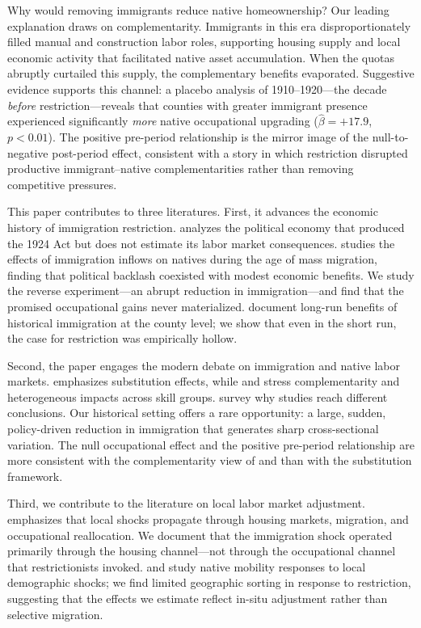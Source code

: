 \documentclass[12pt]{article}
\begin{document}
Why would removing immigrants reduce native homeownership? Our leading explanation draws on complementarity. Immigrants in this era disproportionately filled manual and construction labor roles, supporting housing supply and local economic activity that facilitated native asset accumulation. When the quotas abruptly curtailed this supply, the complementary benefits evaporated. Suggestive evidence supports this channel: a placebo analysis of 1910--1920---the decade \textit{before} restriction---reveals that counties with greater immigrant presence experienced significantly \textit{more} native occupational upgrading ($\hat{\beta} = +17.9$, $p < 0.01$). The positive pre-period relationship is the mirror image of the null-to-negative post-period effect, consistent with a story in which restriction disrupted productive immigrant--native complementarities rather than removing competitive pressures.

This paper contributes to three literatures. First, it advances the economic history of immigration restriction. \citet{goldin1994} analyzes the political economy that produced the 1924 Act but does not estimate its labor market consequences. \citet{tabellini2020} studies the effects of immigration inflows on natives during the age of mass migration, finding that political backlash coexisted with modest economic benefits. We study the reverse experiment---an abrupt reduction in immigration---and find that the promised occupational gains never materialized. \citet{sequeira2020} document long-run benefits of historical immigration at the county level; we show that even in the short run, the case for restriction was empirically hollow.

Second, the paper engages the modern debate on immigration and native labor markets. \citet{borjas2003} emphasizes substitution effects, while \citet{ottaviano2012} and \citet{card2009} stress complementarity and heterogeneous impacts across skill groups. \citet{dustmann2016} survey why studies reach different conclusions. Our historical setting offers a rare opportunity: a large, sudden, policy-driven reduction in immigration that generates sharp cross-sectional variation. The null occupational effect and the positive pre-period relationship are more consistent with the complementarity view of \citet{ottaviano2012} and \citet{peri2016} than with the substitution framework.

Third, we contribute to the literature on local labor market adjustment. \citet{moretti2011} emphasizes that local shocks propagate through housing markets, migration, and occupational reallocation. We document that the immigration shock operated primarily through the housing channel---not through the occupational channel that restrictionists invoked. \citet{boustan2010} and \citet{hornbeck2012} study native mobility responses to local demographic shocks; we find limited geographic sorting in response to restriction, suggesting that the effects we estimate reflect in-situ adjustment rather than selective migration.
\end{document}
